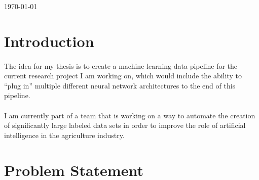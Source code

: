 \documentclass[12pt]{article}
\begin{document}
\begin{titlepage}
	
	
	\vfill\vfill\vfill %
	
	{\large\today} %
	
	
	
	
	\vfill %
	
\end{titlepage}

	\section{Introduction}
		\paragraph{}
			The idea for my thesis is to create a machine learning data pipeline for the current research project I am working on, which would include the ability to \enquote{plug in} multiple different neural network architectures to the end of this pipeline.
			
		\paragraph{}
			I am currently part of a team that is working on a way to automate the creation of significantly large labeled data sets in order to improve the role of artificial intelligence in the agriculture industry.
	
	\section{Problem Statement}
\end{document}
